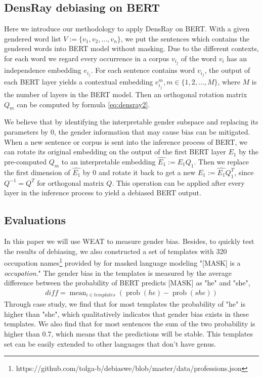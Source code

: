 \subsection{DensRay debiasing on BERT}
Here we introduce our methodology to apply DensRay on BERT. With a given gendered word list $V:=\{v_1,v_2,\dots,v_n\}$, we put the sentences which contains the gendered words into BERT model without masking. Due to the different contexts, for each word we regard every occurrence in a corpus $v_{i_j}$ of the word $v_i$ has an independence embedding $e_{i_j}$. For each sentence contains word $v_{i_j}$, the output of each BERT layer yields a contextual embedding $e_{i_j}^m,m\in\{1,2,\dots,M\}$, where $M$ is the number of layers in the BERT model. Then an orthogonal rotation matrix $Q_m$ can be computed by formula \ref{eq:densray2}.

We believe that by identifying the interpretable gender subspace and replacing its parameters by $0$, the gender information that may cause bias can be mitigated. When a new sentence or corpus is sent into the inference process of BERT, we can rotate its original embedding on the output of the first BERT layer $E_1$ by the pre-computed $Q_m$ to an interpretable embedding $\hat{E_1}:=E_1Q_1$. Then we replace the first dimension of $\hat{E_1}$ by $0$ and rotate it back to get a new $E_1:=\hat{E_1}Q_1^T$, since $Q^{-1}=Q^T$ for orthogonal matrix $Q$. This operation can be applied after every layer in the inference process to yield a debiased BERT output. 

\subsection{Evaluations}\label{sec:eval}
In this paper we will use WEAT to measure gender bias. Besides, to quickly test the results of debiasing, we also constructed a set of templates with 320 occupation names\footnote{https://github.com/tolga-b/debiaswe/blob/master/data/professions.json} provided by \citet{bolukbasi2016man} for masked language modeling "[MASK] is a \textit{occupation}." The gender bias in the templates is measured by the average difference between the probability of BERT predicts [MASK] as "he" and "she",
\begin{eqnarray}
    diff=\mathop{mean}_{i \in templates}(\mathop{prob}(he)-\mathop{prob}(she))\nonumber
\end{eqnarray}
Through case study, we find that for most templates the probability of "he" is higher than "she", which qualitatively indicates that gender bias exists in these templates. We also find that for most sentences the sum of the two probability is higher than 0.7, which means that the predictions will be stable. This templates set can be easily extended to other languages that don't have genus.
